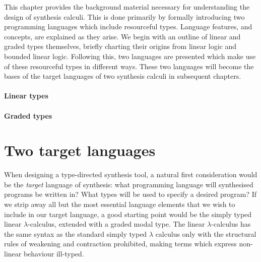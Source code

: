This chapter provides the background material necessary for understanding the
design of synthesis calculi. This is done primarily by formally introducing two programming languages
which include resourceful types. Language features, and concepts, are explained
as they arise. We begin with an outline of linear and graded
types themselves, briefly charting their origins from linear logic and bounded
linear logic. Following this, two languages are presented which make use of
these resourceful types in different ways. These two languages will become the
bases of the target languages of two synthesis calculi in subsequent chapters.



\paragraph{Linear types}



\paragraph{Graded types}


\section{Two target languages}
When designing a type-directed synthesis tool, a natural first consideration would be
the \textit{target} language of synthesis: what programming language
will synthesised programs be written in? What types will be used to specify a
desired program?
If we strip away all but the most essential language elements that we wish to
include in our target language, a good starting point would be the simply typed
linear $\lambda$-calculus, extended with a graded modal type. The linear
$\lambda$-calculus has the same syntax as the standard simply typed $\lambda$
calculus only with the structural rules of weakening and contraction
prohibited, making terms which express non-linear behaviour ill-typed.


